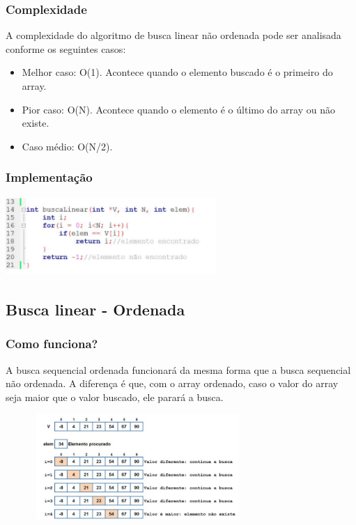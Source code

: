 \documentclass{report}
\begin{document}
	\subsubsection{Complexidade}
	
	A complexidade do algoritmo de busca linear não ordenada pode ser analisada conforme os seguintes casos:
	
	\begin{itemize}
		\item Melhor caso: O(1). Acontece quando o elemento buscado é o primeiro do array.
		\item Pior caso: O(N). Acontece quando o elemento é o último do array ou não existe.
		\item Caso médio: O(N/2). 
	\end{itemize}
	
	\subsubsection{Implementação}
	
	\begin{center}
		
		\includegraphics[width=8cm,height=3cm,keepaspectratio=false]{imagens/blinear.png}
		
	\end{center}
	
	\subsection{Busca linear - Ordenada}
	\subsubsection{Como funciona?}
	A busca sequencial ordenada funcionará da mesma forma que a busca sequencial não ordenada. A diferença é que, com o array ordenado, caso o valor do array seja maior que o valor buscado, ele parará a busca.
	
	\begin{center}
	
	\includegraphics[width=10cm,height=4cm,keepaspectratio=false]{imagens/blinearordenada.png}
	
	\end{center}
	
\end{document}
